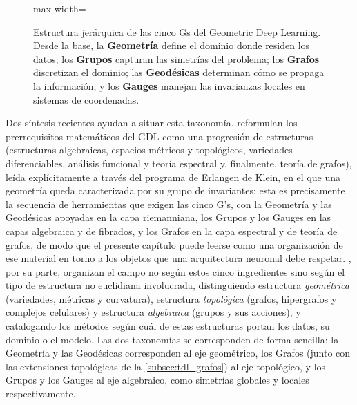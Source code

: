 \begin{figure}[htbp]
\begin{adjustbox}{max width=\textwidth}
\end{adjustbox}
\caption[Jerarquía de las cinco Gs del GDL]{Estructura jerárquica de las cinco Gs del Geometric Deep Learning. Desde la base, la \textbf{Geometría} define el dominio donde residen los datos; los \textbf{Grupos} capturan las simetrías del problema; los \textbf{Grafos} discretizan el dominio; las \textbf{Geodésicas} determinan cómo se propaga la información; y los \textbf{Gauges} manejan las invarianzas locales en sistemas de coordenadas.}
\label{fig:jerarquia_5gs}
\end{figure}

Dos síntesis recientes ayudan a situar esta taxonomía. \citet{saezdeocarizborde2025mathfoundations} reformulan los prerrequisitos matemáticos del \gls{GDL} como una progresión de estructuras (estructuras algebraicas, espacios métricos y topológicos, variedades diferenciables, análisis funcional y teoría espectral y, finalmente, teoría de grafos), leída explícitamente a través del programa de Erlangen de Klein, en el que una geometría queda caracterizada por su grupo de invariantes; esta es precisamente la secuencia de herramientas que exigen las cinco G's, con la Geometría y las Geodésicas apoyadas en la capa riemanniana, los Grupos y los Gauges en las capas algebraica y de fibrados, y los Grafos en la capa espectral y de teoría de grafos, de modo que el presente capítulo puede leerse como una organización de ese material en torno a los objetos que una arquitectura neuronal debe respetar. \citet{papillon2024beyondeuclid}, por su parte, organizan el campo no según estos cinco ingredientes sino según el tipo de estructura no euclidiana involucrada, distinguiendo estructura \textit{geométrica} (variedades, métricas y curvatura), estructura \textit{topológica} (grafos, hipergrafos y complejos celulares) y estructura \textit{algebraica} (grupos y sus acciones), y catalogando los métodos según cuál de estas estructuras portan los datos, su dominio o el modelo. Las dos taxonomías se corresponden de forma sencilla: la Geometría y las Geodésicas corresponden al eje geométrico, los Grafos (junto con las extensiones topológicas de la \autoref{subsec:tdl_grafos}) al eje topológico, y los Grupos y los Gauges al eje algebraico, como simetrías globales y locales respectivamente.

